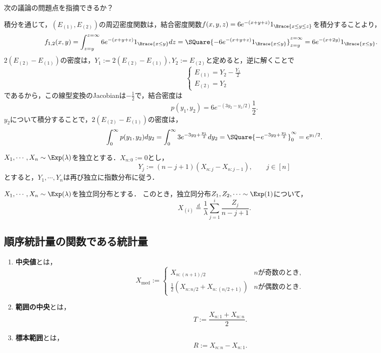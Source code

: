 \documentclass[uplatex,dvipdfmx]{jsreport}
\begin{document}
\begin{remark}
    次の議論の問題点を指摘できるか？
\end{remark}
\begin{Proof}[［誤った議論］]
    積分を通じて，$(E_{(1)},E_{(2)})$の周辺密度関数は，結合密度関数$f(x,y,z)=6e^{-(x+y+z)}1_{\Brace{x\le y\le z}}$を積分することより，
    \begin{align*}
        f_{1,2}(x,y)&=\int^{z=\infty}_{z=y}6e^{-(x+y+z)}1_{\Brace{x\le y}}dz
        =\SQuare{-6e^{-(x+y+z)}1_{\Brace{x\le y}}}^{z=\infty}_{z=y}=6e^{-(x+2y)}1_{\Brace{x\le y}}.
    \end{align*}
    $2(E_{(2)}-E_{(1)})$の密度は，$Y_1:=2(E_{(2)}-E_{(1)}),Y_2:=E_{(2)}$と定めると，逆に解くことで
    \[\begin{cases}
        E_{(1)}=Y_2-\frac{Y_1}{2}\\
        E_{(2)}=Y_2
    \end{cases}\]
    であるから，この線型変換のJacobianは$-\frac{1}{2}$で，結合密度は
    \[p(y_1,y_2)=6e^{-(3y_2-y_1/2)}\frac{1}{2}.\]
    $y_2$について積分することで，$2(E_{(2)}-E_{(1)})$の密度は，
    \begin{align*}
        \int^\infty_0p(y_1,y_2)dy_2=\int^\infty_03e^{-3y_2+\frac{y_1}{2}}dy_2=\SQuare{-e^{-3y_2+\frac{y_1}{2}}}^\infty_0=e^{y_1/2}.
    \end{align*}
\end{Proof}

\begin{proposition}
    $X_1,\cdots,X_n\sim\Exp(\lambda)$を独立とする．$X_{n:0}:=0$とし，
    \[Y_j:=(n-j+1)(X_{n:j}-X_{n:j-1}),\qquad j\in[n]\]
    とすると，$Y_1,\cdots,Y_n$は再び独立に指数分布に従う．
\end{proposition}
\begin{remarks}
    $X_1,\cdots,X_n\sim\Exp(\lambda)$を独立同分布とする．
    このとき，独立同分布$Z_1,Z_2,\cdots\sim\Exp(1)$について，
    \[X_{(i)}\overset{d}{=}\frac{1}{\lambda}\sum_{j=1}^i\frac{Z_j}{n-j+1}.\]
\end{remarks}

\subsection{順序統計量の関数である統計量}

\begin{definition}
    \begin{enumerate}
        \item \textbf{中央値}とは，
        \[X_{\mathrm{med}}:=\begin{cases}
            X_{n:(n+1)/2}&n\text{が奇数のとき},\\
            \frac{1}{2}(X_{n:n/2}+X_{n:(n/2+1)})&n\text{が偶数のとき}.
        \end{cases}\]
        \item \textbf{範囲の中央}とは，
        \[T:=\frac{X_{n:1}+X_{n:n}}{2}.\]
        \item \textbf{標本範囲}とは，
        \[R:=X_{n:n}-X_{n:1}.\]
    \end{enumerate}
\end{definition}
\end{document}
